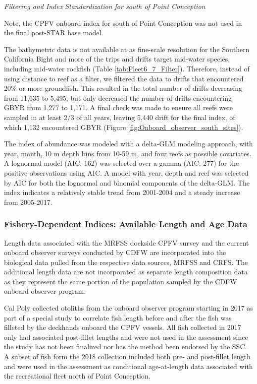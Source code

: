 \documentclass[12pt,]{article}
\begin{document}
\emph{Filtering and Index Standardization for south of Point Conception}

Note, the CPFV onboard index for south of Point Conception was not used
in the final post-STAR base model.

The bathymetric data is not available at as fine-scale resolution for
the Southern California Bight and more of the trips and drifts target
mid-water species, including mid-water rockfish (Table
\ref{tab:Fleet6_7_Filter}). Therefore, instead of using distance to reef
as a filter, we filtered the data to drifts that encountered 20\% or
more groundfish. This resulted in the total number of drifts decreasing
from 11,635 to 5,495, but only decreased the number of drifts
encountering GBYR from 1,277 to 1,171. A final check was made to ensure
all reefs were sampled in at least 2/3 of all years, leaving 5,440 drift
for the final index, of which 1,132 encountered GBYR (Figure
\ref{fig:Onboard_observer_south_sites}).

The index of abundance was modeled with a delta-GLM modeling approach,
with year, month, 10 m depth bins from 10-59 m, and four reefs as
possible covariates. A lognormal model (AIC: 162) was selected over a
gamma (AIC: 277) for the positive observations using AIC. A model with
year, depth and reef was selected by AIC for both the lognormal and
binomial components of the delta-GLM. The index indicates a relatively
stable trend from 2001-2004 and a steady increase from 2005-2017.

\subsubsection{Fishery-Dependent Indices: Available Length and Age
Data}\label{fishery-dependent-indices-available-length-and-age-data}

Length data associated with the MRFSS dockside CPFV survey and the
current onboard observer surveys conducted by CDFW are incorporated into
the biological data pulled from the respective data sources, MRFSS and
CRFS. The additional length data are not incorporated as separate length
composition data as they represent the same portion of the population
sampled by the CDFW onboard observer program.

Cal Poly collected otoliths from the onboard observer program starting
in 2017 as part of a special study to correlate fish length before and
after the fish was filleted by the deckhands onboard the CPFV vessels.
All fish collected in 2017 only had associated post-fillet lengths and
were not used in the assessment since the study has not been finalized
nor has the method been endorsed by the SSC. A subset of fish form the
2018 collection included both pre- and post-fillet length and were used
in the assessment as conditional age-at-length data associated with the
recreational fleet north of Point Conception.
\end{document}
